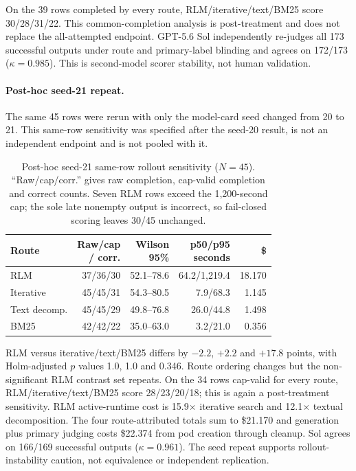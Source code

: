 \documentclass[letterpaper]{article}
\begin{document}
On the 39 rows completed by every route, RLM/iterative/text/BM25 score
30/28/31/22. This common-completion analysis is post-treatment and does not
replace the all-attempted endpoint. GPT-5.6 Sol independently re-judges all
173 successful outputs under route and primary-label blinding and agrees on
172/173 ($\kappa{=}0.985$). This is second-model scorer stability, not human
validation.

\paragraph{Post-hoc seed-21 repeat.}
The same 45 rows were rerun with only the model-card seed changed from 20 to
21. This same-row sensitivity was specified after the seed-20 result, is not
an independent endpoint and is not pooled with it.

\begin{table}[!htbp]
\centering
\small
\setlength{\tabcolsep}{1pt}
\begin{tabular}{@{}lrrrr@{}}
\toprule
\textbf{Route} & \shortstack{\textbf{Raw/cap}\\\textbf{/ corr.}} &
\shortstack{\textbf{Wilson}\\\textbf{95\%}} &
\shortstack{\textbf{p50/p95}\\\textbf{seconds}} & \textbf{\$} \\
\midrule
RLM & 37/36/30 & 52.1--78.6 & 64.2/1,219.4 & 18.170 \\
Iterative & 45/45/31 & 54.3--80.5 & 7.9/68.3 & 1.145 \\
Text decomp. & 45/45/29 & 49.8--76.8 & 26.0/44.8 & 1.498 \\
BM25 & 42/42/22 & 35.0--63.0 & 3.2/21.0 & 0.356 \\
\bottomrule
\end{tabular}
\caption{Post-hoc seed-21 same-row rollout sensitivity ($N=45$).
``Raw/cap/corr.'' gives raw completion, cap-valid completion and correct
counts. Seven RLM rows exceed the 1,200-second cap; the sole late nonempty
output is incorrect, so fail-closed scoring leaves 30/45 unchanged.}
\label{tab:supp-browsecomp-equal-cap-seed21}
\end{table}

RLM versus iterative/text/BM25 differs by $-2.2$, $+2.2$ and $+17.8$
points, with Holm-adjusted $p$ values 1.0, 1.0 and 0.346. Route ordering
changes but the non-significant RLM contrast set repeats. On the 34 rows
cap-valid for every route, RLM/iterative/text/BM25 score 28/23/20/18; this is
again a post-treatment sensitivity. RLM active-runtime cost is
15.9$\times$ iterative search and 12.1$\times$ textual decomposition. The
four route-attributed totals sum to \$21.170 and generation plus primary
judging costs \$22.374 from pod creation through cleanup. Sol agrees on
166/169 successful outputs ($\kappa{=}0.961$). The seed repeat supports
rollout-instability caution, not equivalence or independent replication.
\end{document}
